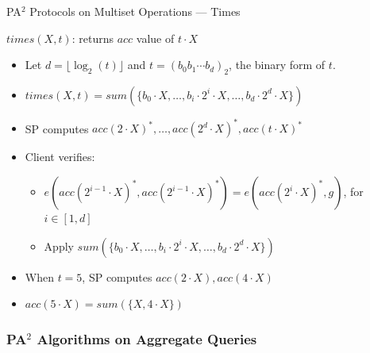 \documentclass[xcolor={dvipsnames},aspectratio=169,10pt]{beamer}
\begin{document}
\begin{frame}{PA$^2$ Protocols on Multiset Operations --- Times}
  \begin{block}{$times(X, t)$: returns $acc$ value of $t \cdot X$}
    \begin{itemize}
      \item Let $d = \lfloor \log_2(t) \rfloor$ and $t = {(b_0b_1\cdots b_d)}_2$, the \alert{binary form} of $t$.
      \item $times(X, t) = sum(\{b_0 \cdot X, \dotsc, b_i \cdot 2^i \cdot X, \dotsc, b_d \cdot 2^d \cdot X\})$
      \item SP computes ${acc(2\cdot X)}^*, \dotsc, {acc({2^d} \cdot X)}^*, {acc(t \cdot X)}^*$
      \item Client verifies:
        \begin{itemize}
          \item $e({acc(2^{i-1} \cdot X)}^*, {acc(2^{i-1} \cdot X)}^*) = e({acc(2^{i} \cdot X)}^*, g)$, for $i \in [1, d]$
          \item Apply $sum(\{b_0 \cdot X, \dotsc, b_i \cdot 2^i \cdot X, \dotsc, b_d \cdot 2^d \cdot X\})$
        \end{itemize}
    \end{itemize}
  \end{block}
  \begin{example}
    \begin{itemize}
      \item When $t = 5$, SP computes $acc(2\cdot X), acc(4\cdot X)$
      \item $acc(5 \cdot X) = sum(\{X, 4\cdot X\})$
    \end{itemize}
  \end{example}
\end{frame}

\subsubsection{PA$^2$ Algorithms on Aggregate Queries}
\end{document}

